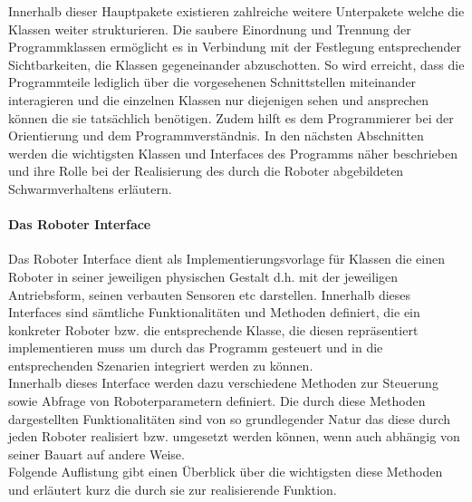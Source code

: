 Innerhalb dieser Hauptpakete existieren zahlreiche weitere Unterpakete welche die Klassen weiter strukturieren. Die saubere Einordnung
und Trennung der Programmklassen ermöglicht es in Verbindung mit der Festlegung entsprechender Sichtbarkeiten, die Klassen gegeneinander 
abzuschotten. So wird erreicht, dass die Programmteile lediglich über die vorgesehenen Schnittstellen miteinander interagieren und die
einzelnen Klassen nur diejenigen sehen und ansprechen können die sie tatsächlich benötigen. Zudem hilft es dem Programmierer bei der Orientierung und dem Programmverständnis.
\medskip
\newline
In den nächsten Abschnitten werden die wichtigsten Klassen und Interfaces des Programms näher beschrieben und ihre Rolle bei der 
Realisierung des durch die Roboter abgebildeten Schwarmverhaltens erläutern.
\paragraph{Das Roboter Interface}
\color{process}             %
Das Roboter Interface dient als Implementierungsvorlage für Klassen die einen Roboter in seiner jeweiligen physischen Gestalt d.h. mit
der jeweiligen Antriebsform, seinen verbauten Sensoren etc darstellen. Innerhalb dieses Interfaces sind sämtliche Funktionalitäten 
und Methoden definiert, die ein konkreter Roboter bzw. die entsprechende Klasse, die diesen repräsentiert implementieren muss um durch 
das Programm gesteuert und in die entsprechenden Szenarien integriert werden zu können. \\
Innerhalb dieses Interface werden dazu verschiedene Methoden zur Steuerung sowie Abfrage von Roboterparametern definiert. Die durch 
diese Methoden dargestellten Funktionalitäten sind von so grundlegender Natur das diese durch jeden Roboter realisiert bzw. umgesetzt 
werden können, wenn auch abhängig von seiner Bauart auf andere Weise. \\
Folgende Auflistung gibt einen Überblick über die wichtigsten diese Methoden und erläutert kurz die durch sie zur realisierende Funktion.
